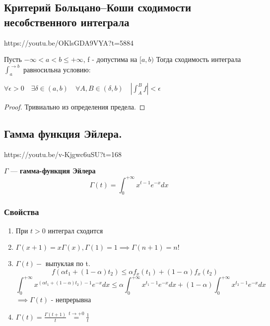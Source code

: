 \documentclass[../main.tex]{subfiles}
\begin{document}
\subsection{Критерий Больцано--Коши сходимости несобственного интеграла}
https://youtu.be/OKlsGDA9VYA?t=5884

Пусть $-\infty<a<b\leq+\infty$, f - допустима на $[a, b)$
Тогда сходимость интеграла $\int_a^{\rightarrow b}$
равносильна условию:

$\forall \epsilon > 0 \quad \exists \delta \in (a,b) \quad \forall A, B \in (\delta, b) \quad |\int_A^B f| < \epsilon$
\begin{proof}
    Тривиально из определения предела.
\end{proof}

\newpage
\subsection{Гамма функция Эйлера.}
https://youtu.be/v-Kjgwc6uSU?t=168

$\Gamma$ --- \textbf{гамма-функция Эйлера}
$$\Gamma(t)=\int_0^{+\infty} x^{t-1}e^{-x}dx$$

\subsubsection*{Свойства}
    \begin{enumerate}
        \item При $t > 0$ интеграл сходится
        \item $\Gamma(x + 1) = x \Gamma(x), \Gamma(1) = 1 \implies \Gamma(n + 1) = n!$
        \item $\Gamma(t) - $ выпуклая по t.
        \quad $$f(\alpha t_1 + (1-\alpha)t_2)\leq \alpha f_x(t_1) + (1-\alpha)f_x(t_2)$$
        $$\int_0^{+\infty} x^{(\alpha t_1 + (1-\alpha)t_2)-1}e^{-x}dx\leq \alpha \int_0^{+\infty}x^{t_1-1}e^{-x}dx+(1-\alpha)\int_0^{+\infty}x^{t_2-1}e^{-x}dx$$
        $\implies \Gamma(t)$ - непрерывна
        \item 
        $\Gamma(t) = \frac{\Gamma(t+1)}{t} \stackrel{t\to +0}{=}\frac{1}{t}$

    \end{enumerate}
\newpage
\end{document}

